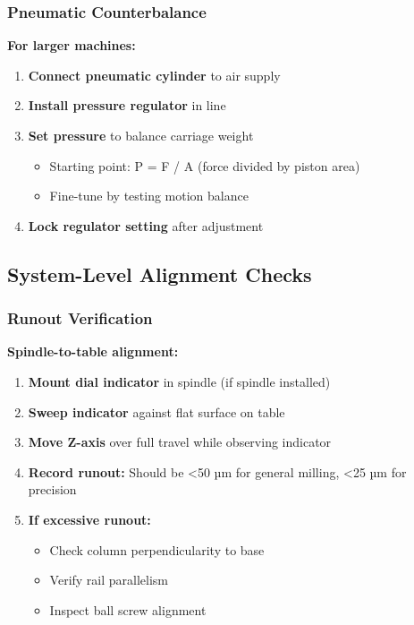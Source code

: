 \documentclass[
]{article}
\providecommand{\tightlist}{%
  \setlength{\itemsep}{0pt}\setlength{\parskip}{0pt}}
\begin{document}
\subsubsection{Pneumatic Counterbalance}\label{pneumatic-counterbalance}

\textbf{For larger machines:}

\begin{enumerate}
\def\labelenumi{\arabic{enumi}.}
\tightlist
\item
  \textbf{Connect pneumatic cylinder} to air supply
\item
  \textbf{Install pressure regulator} in line
\item
  \textbf{Set pressure} to balance carriage weight

  \begin{itemize}
  \tightlist
  \item
    Starting point: P = F / A (force divided by piston area)
  \item
    Fine-tune by testing motion balance
  \end{itemize}
\item
  \textbf{Lock regulator setting} after adjustment
\end{enumerate}

\subsection{System-Level Alignment
Checks}\label{system-level-alignment-checks}

\subsubsection{Runout Verification}\label{runout-verification}

\textbf{Spindle-to-table alignment:}

\begin{enumerate}
\def\labelenumi{\arabic{enumi}.}
\tightlist
\item
  \textbf{Mount dial indicator} in spindle (if spindle installed)
\item
  \textbf{Sweep indicator} against flat surface on table
\item
  \textbf{Move Z-axis} over full travel while observing indicator
\item
  \textbf{Record runout:} Should be \textless50 µm for general milling,
  \textless25 µm for precision
\item
  \textbf{If excessive runout:}

  \begin{itemize}
  \tightlist
  \item
    Check column perpendicularity to base
  \item
    Verify rail parallelism
  \item
    Inspect ball screw alignment
  \end{itemize}
\end{enumerate}
\end{document}
